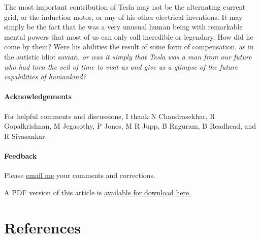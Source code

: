 \documentclass[
  12pt,
  british,
  a4paper,
]{article}
\begin{document}
The most important contribution of Tesla may not be the alternating
current grid, or the induction motor, or any of his other electrical
inventions. It may simply be the fact that he was a very unusual human
being with remarkable mental powers that most of us can only call
incredible or legendary. How did he come by them? Were his abilities the
result of some form of compensation, as in the autistic idiot savant,
\emph{or was it simply that Tesla was a man from our future who had torn
the veil of time to visit us and give us a glimpse of the future
capabilities of humankind?}

\hypertarget{acknowledgements}{%
\paragraph{Acknowledgements}\label{acknowledgements}}

For helpful comments and discussions, I thank N Chandrasekhar, R
Gopalkrishnan, M Jegasothy, P Jones, M R Jupp, B Raguram, B Readhead,
and R Sivasankar.

\hypertarget{feedback}{%
\paragraph{Feedback}\label{feedback}}

Please \href{mailto:feedback.swanlotus@gmail.com}{email me} your
comments and corrections.

\noindent A PDF version of this article is
\href{./mind-of-tesla.pdf}{available for download here.}

\hypertarget{bibliography}{%
\section*{References}\label{bibliography}}
\end{document}
